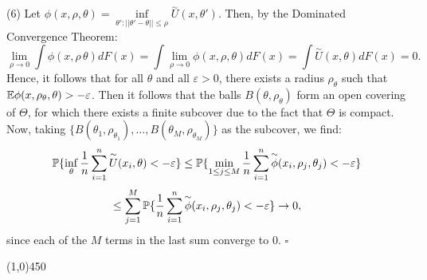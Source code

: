 \documentclass[12pt]{article}
\begin{document}
\pagebreak

\noindent
(6) Let $\phi(x,\rho,\theta) = \underset{\theta':||\theta'-\theta||\leq \rho}\inf \overset{\sim}U(x,\theta')$. Then, by the Dominated Convergence Theorem:
$$\lim\limits_{\rho\to 0} \int \phi(x,\rho\,\theta) dF(x) 
= \int \lim\limits_{\rho\to 0} \phi(x,\rho,\theta) dF(x)
= \int \overset{\sim}U(x,\theta) dF(x) = 0.$$
Hence, it follows that for all $\theta$ and all $\varepsilon>0$, there exists a radius $\rho_\theta$ such that\\ $\mathbb{E} \phi(x,\rho_\theta,\theta) > -\varepsilon$. Then it follows that the balls $B(\theta,\rho_\theta)$ form an open covering of $\Theta$, for which there exists a finite subcover due to the fact that $\Theta$ is compact. Now, taking $\{ B(\theta_1,\rho_{\theta_1}), \dots, B(\theta_M,\rho_{\theta_M})\}$ as the subcover, we find:
$$\mathbb{P}\{\inf\limits_\theta \frac{1}{n}\sum\limits_{i=1}^n \overset{\sim}U(x_i,\theta) < - \varepsilon\}
\leq \mathbb{P}\{ \min_{1\leq j\leq M} \frac{1}{n} \sum\limits_{i=1}^n \overset{\sim}\phi(x_i,\rho_j,\theta_j) < -\varepsilon\}$$
$$\leq \sum\limits_{j=1}^M \mathbb{P}\{\frac{1}{n} \sum\limits_{i=1}^n \overset{\sim}\phi(x_i,\rho_j,\theta_j) < -\varepsilon\}
\to 0,$$
since each of the $M$ terms in the last sum converge to 0. $\square$

\begin{center}
\line(1,0){450}
\end{center}
\end{document}
